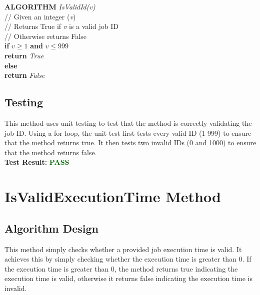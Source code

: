 \documentclass[12pt,a4paper]{article}
\begin{document}
			\textbf{ALGORITHM} \textit{IsValidId(v)}\\
			\null\hspace{1cm}// Given an integer (\textit{v})\\
			\null\hspace{1cm}// Returns True if \textit{v} is a valid job ID\\
			\null\hspace{1cm}// Otherwise returns False\\
			\null\hspace{1cm}\textbf{if} \textit{$v \geq 1$} \textbf{and} \textit{$v \leq 999$}\\
			\null\hspace{2cm}\textbf{return} \textit{True}\\
			\null\hspace{1cm}\textbf{else}\\
			\null\hspace{2cm}\textbf{return} \textit{False}\\

		\subsection{Testing}
			This method uses unit testing to test that the method is correctly validating the 
			job ID. Using a for loop, the unit test first tests every valid ID (1-999) to ensure that 
			the method returns true. It then tests two invalid IDs (0 and 1000) to ensure that the method 
			returns false.\\

			\textbf{Test Result:} \textbf{\textcolor{darkgreen}{PASS}}\\

	\newpage

	\section{IsValidExecutionTime Method}
		\subsection{Algorithm Design}
			This method simply checks whether a provided job execution time is valid. It achieves 
			this by simply checking whether the execution time is greater than 0. If the execution 
			time is greater than 0, the method returns true indicating the execution time is valid,
			otherwise it returns false indicating the execution time is invalid.\\
\end{document}
